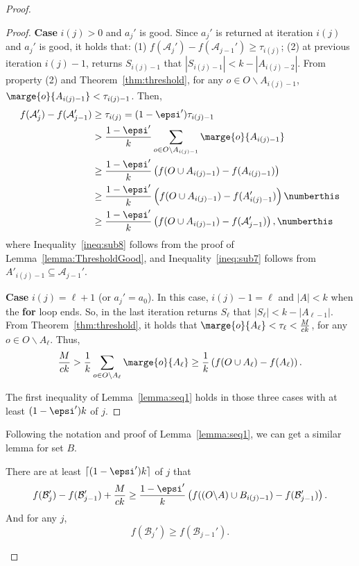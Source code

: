 \begin{proof}
\begin{proof}
    \textbf{Case} $i(j)>0$ and $a_j'$ is good.
    Since $a_j'$ is returned at iteration $i(j)$ and $a_j'$ is good, it holds that:
    (1) $f(\mathcal{A}_j')-f(\mathcal{A}_{j-1}')\ge \tau_{i(j)}$; 
    (2) at previous iteration $i(j)-1$, \threseq returns $S_{i(j)-1}$ that $|S_{i(j)-1}| < k-|A_{i(j)-2}|$.
    From property (2) and Theorem~\ref{thm:threshold}, for any $o \in O\backslash A_{i(j)-1}$,
    $\marge{o}{A_{i(j)-1}} < \tau_{i(j)-1}$.
    Then,
    \begin{align*}
      f(\mathcal{A}_j')-f(\mathcal{A}_{j-1}')&\ge \tau_{i(j)}= (1-\epsi')\tau_{i(j)-1}\\
      &> \frac{1-\epsi'}{k}\sum_{o\in O\backslash A_{i(j)-1}}\marge{o}{A_{i(j)-1}}\\
      &\ge \frac{1-\epsi'}{k}\left(f(O\cup A_{i(j)-1})-f(A_{i(j)-1})\right)\\
      &\ge \frac{1-\epsi'}{k}\left(f(O\cup A_{i(j)-1})-f(A'_{i(j)-1})\right) \numberthis \label{ineq:sub8}\\
      &\ge \frac{1-\epsi'}{k}\left(f(O\cup A_{i(j)-1})-f(\mathcal{A}_{j-1}')\right), \numberthis \label{ineq:sub7}
    \end{align*}
    where Inequality~\ref{ineq:sub8} follows from the proof of Lemma~\ref{lemma:ThresholdGood},
    and Inequality~\ref{ineq:sub7} follows from $A'_{i(j)-1} \subseteq \mathcal{A}_{j-1}'$.

    \textbf{Case} $i(j)=\ell+1$ (or $a_j'=a_0$). In this case, $i(j)-1=\ell$ and $|A|<k$ when the \textbf{for} loop ends.
    So, \threseq in the last iteration returns $S_\ell$ that $|S_\ell| < k-|A_{\ell-1}|$.
    From Theorem~\ref{thm:threshold}, it holds that $\marge{o}{A_{\ell}} < \tau_\ell < \frac{M}{ck}$, 
    for any $o \in O\backslash A_{\ell}$.
    Thus,
    $$\frac{M}{ck}> \frac{1}{k}\sum_{o\in O\backslash A_{\ell}} \marge{o}{A_{\ell}}\ge 
    \frac{1}{k}\left(f(O\cup A_\ell) - f(A_\ell)\right).$$

    The first inequality of Lemma~\ref{lemma:seq1} holds in those three cases
    with at least $(1-\epsi')k$ of $j$.
  \end{proof}

  Following the notation and proof of Lemma~\ref{lemma:seq1},
  we can get a similar lemma for set $B$.
  \begin{lemma} \label{lemma:seq2}
    There are at least $\lceil(1-\epsi')k\rceil$ of $j$ that 
    $$f(\mathcal{B}_j')-f(\mathcal{B}_{j-1}')+\frac{M}{ck}\ge 
    \frac{1-\epsi'}{k}\left(f((O\backslash A)\cup B_{i(j)-1})-f(\mathcal{B}_{j-1}')\right).$$
    And for any $j$,
    $$f(\mathcal{B}_j')\ge f(\mathcal{B}_{j-1}').$$
  \end{lemma}


\end{proof}
